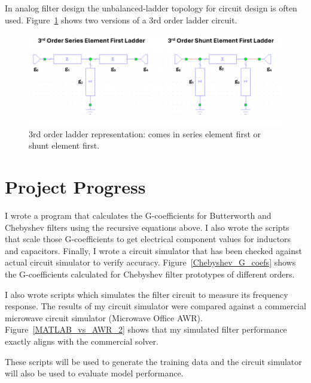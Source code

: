 \documentclass[10pt,conference]{IEEEtran}
\begin{document}
In analog filter design the unbalanced-ladder topology for circuit design is often used. Figure~\ref{Ladder_Topology_3rd_order} shows two versions of a 3rd order ladder circuit.

\begin{figure}
	\centering
	\includegraphics[width=0.9\linewidth]{Figures/Ladder_Topology_3rd_order.png}
	\caption{3rd order ladder representation: comes in series element first or shunt element first.}
	\label{Ladder_Topology_3rd_order}
\end{figure}





\section{Project Progress}

I wrote a program that calculates the G-coefficients for Butterworth and Chebyshev filters using the recursive equations above. I also wrote the scripts that scale those G-coefficients to get electrical component values for inductors and capacitors. Finally, I wrote a circuit simulator that has been checked against actual circuit simulator to verify accuracy. Figure~\ref{Chebyshev_G_coefs} shows the G-coefficients calculated for Chebyshev filter prototypes of different orders.


I also wrote scripts which simulates the filter circuit to measure its frequency response. The results of my circuit simulator were compared against a commercial microwave circuit simulator (Microwave Office AWR). Figure~\ref{MATLAB_vs_AWR_2} shows that my simulated filter performance exactly aligns with the commercial solver.

These scripts will be used to generate the training data and the circuit simulator will also be used to evaluate model performance.
\end{document}
